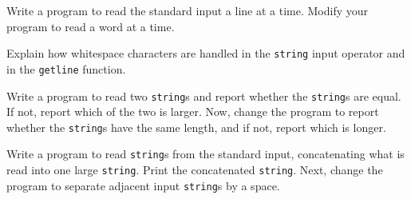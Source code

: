 %
%
\begin{question}
Write a program to read the standard input a line at a time.
Modify your program to read a word at a time.
\end{question}

\begin{question}
Explain how whitespace characters are handled in the \verb|string|
input operator and in the \verb|getline| function.
\end{question}

\begin{question}
Write a program to read two \verb|string|s and report whether the
\verb|string|s are equal. If not, report which of the two is larger. Now, change
the program to report whether the \verb|string|s have the same length, and if
not, report which is longer.
\end{question}

\begin{question}
Write a program to read \verb|string|s from the standard input,
concatenating what is read into one large \verb|string|. Print the concatenated
\verb|string|. Next, change the program to separate adjacent input \verb|string|s by a
space.
\end{question}
